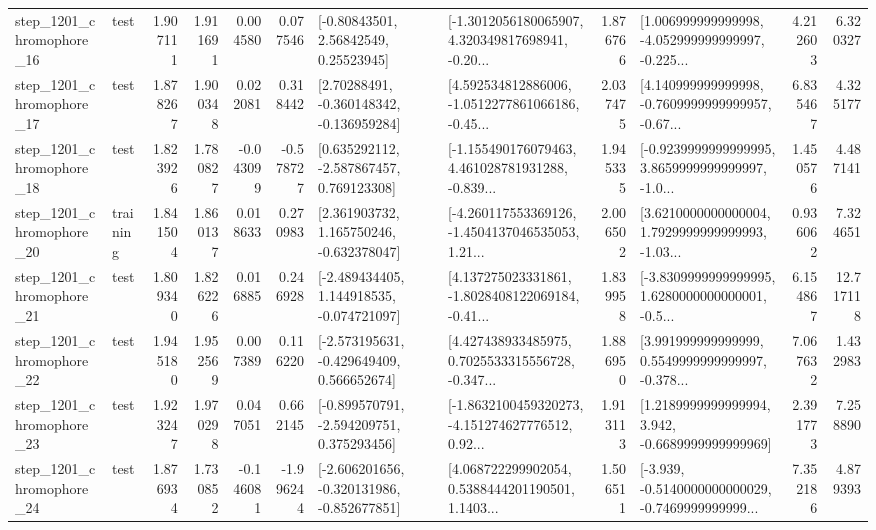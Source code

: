 \begin{tabular}{llrrrrllrlrr}
 step\_1201\_chromophore\_16 &      test &      1.907111 &    1.911691 &      0.004580 &  0.077546 &       [-0.80843501, 2.56842549, 0.25523945] &  [-1.3012056180065907, 4.320349817698941, -0.20... &       1.876766 &  [1.006999999999998, -4.052999999999997, -0.225... &            4.212603 &          6.320327 \\
 step\_1201\_chromophore\_17 &      test &      1.878267 &    1.900348 &      0.022081 &  0.318442 &    [2.70288491, -0.360148342, -0.136959284] &  [4.592534812886006, -1.0512277861066186, -0.45... &       2.037475 &  [4.140999999999998, -0.7609999999999957, -0.67... &            6.835467 &          4.325177 \\
 step\_1201\_chromophore\_18 &      test &      1.823926 &    1.780827 &     -0.043099 & -0.578727 &    [0.635292112, -2.587867457, 0.769123308] &  [-1.155490176079463, 4.461028781931288, -0.839... &       1.945335 &  [-0.9239999999999995, 3.8659999999999997, -1.0... &            1.450576 &          4.487141 \\
 step\_1201\_chromophore\_20 &  training &      1.841504 &    1.860137 &      0.018633 &  0.270983 &    [2.361903732, 1.165750246, -0.632378047] &  [-4.260117553369126, -1.4504137046535053, 1.21... &       2.006502 &  [3.6210000000000004, 1.7929999999999993, -1.03... &            0.936062 &          7.324651 \\
 step\_1201\_chromophore\_21 &      test &      1.809340 &    1.826226 &      0.016885 &  0.246928 &   [-2.489434405, 1.144918535, -0.074721097] &  [4.137275023331861, -1.8028408122069184, -0.41... &       1.839958 &  [-3.8309999999999995, 1.6280000000000001, -0.5... &            6.154867 &         12.717118 \\
 step\_1201\_chromophore\_22 &      test &      1.945180 &    1.952569 &      0.007389 &  0.116220 &   [-2.573195631, -0.429649409, 0.566652674] &  [4.427438933485975, 0.7025533315556728, -0.347... &       1.886950 &  [3.991999999999999, 0.5549999999999997, -0.378... &            7.067632 &          1.432983 \\
 step\_1201\_chromophore\_23 &      test &      1.923247 &    1.970298 &      0.047051 &  0.662145 &   [-0.899570791, -2.594209751, 0.375293456] &  [-1.8632100459320273, -4.151274627776512, 0.92... &       1.913113 &   [1.2189999999999994, 3.942, -0.6689999999999969] &            2.391773 &          7.258890 \\
 step\_1201\_chromophore\_24 &      test &      1.876934 &    1.730852 &     -0.146081 & -1.996244 &  [-2.606201656, -0.320131986, -0.852677851] &  [4.068722299902054, 0.5388444201190501, 1.1403... &       1.506511 &  [-3.939, -0.5140000000000029, -0.7469999999999... &            7.352186 &          4.879393 \\

\end{tabular}
